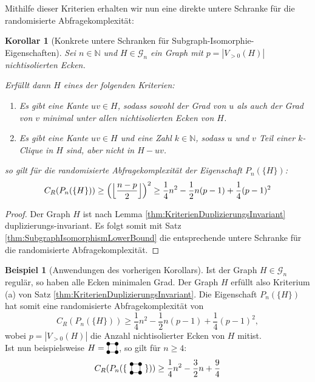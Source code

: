 \documentclass[10pt,a4paper, footheight=1mm, bibliography=totoc]{scrreprt}
\newtheorem{corollary}[definition]{Korollar}
\theoremstyle{definition}
\newtheorem{examplex}{Beispiel}
\newenvironment{example}[1]
{ \begin{leftbar} \begin{examplex}#1}
{ \end{examplex} \ignorespacesafterend \end{leftbar} }
\newcommand{\Square}{
\begin{tikzpicture}[main_node/.style={circle,fill=black},
inner sep=1.5pt, baseline=2pt]

    \node[main_node] (1) at (0,0) {};
    \node[main_node] (2) at (0.35, 0)  {};
    \node[main_node] (3) at (0.35, 0.35) {};
    \node[main_node] (4) at (0, 0.35) {};

    \draw (1) -- (2) -- (3) -- (4) -- (1);
\end{tikzpicture}
}
\begin{document}
Mithilfe dieser Kriterien erhalten wir nun
eine direkte untere Schranke für die randomisierte Abfragekomplexität:
\begin{corollary}[Konkrete untere Schranken für Subgraph-Isomorphie-Eigenschaften]
Sei $n\in \mathbb{N}$ und $H\in \mathcal{G}_n$ ein Graph
mit $p=|V_{>0}(H)|$ nichtisolierten Ecken.

Erfüllt dann $H$ eines der folgenden Kriterien:
\begin{enumerate}[label=\textbf{\emph{(\alph*)}}, leftmargin=*]
\item Es gibt eine Kante $uv\in H$, sodass sowohl
           der Grad von $u$ als auch der Grad von $v$
           minimal unter allen nichtisolierten Ecken von $H$.
\item Es gibt eine Kante $uv \in H$ und eine Zahl
           $k\in \mathbb{N}$, sodass $u$ und $v$
           Teil einer $k$-Clique in $H$ sind, aber nicht
           in $H-uv$.
\end{enumerate}
so gilt für die randomisierte Abfragekomplexität der Eigenschaft 
$P_n(\{H\})$:
$$ C_R(P_n(\{H\})) \geq
\Big{ ( } \Big \lfloor  \frac{n-p}{2} \Big \rfloor \Big{)}^{2} \geq
\frac{1}{4}n^2 - \frac{1}{2}n(p-1) + \frac{1}{4}(p-1)^2
$$
\end{corollary}
\begin{proof}
Der Graph $H$ ist nach Lemma \ref{thm:KriterienDuplizierungsInvariant}
duplizierungs-invariant. Es folgt somit mit 
Satz \ref{thm:SubgraphIsomorphismLowerBound} die entsprechende
untere Schranke für die randomisierte Abfragekomplexität.
\end{proof}

\begin{example}[Anwendungen des vorherigen Korollars]
Ist der Graph $H\in\mathcal{G}_n$ regulär, so haben
alle Ecken minimalen Grad. Der Graph $H$ erfüllt also Kriterium (a)
von Satz \ref{thm:KriterienDuplizierungsInvariant}.
Die Eigenschaft $P_n(\{H\})$ hat somit eine randomisierte
Abfragekomplexität von 
$$ C_R(P_n(\{H\})) \geq
\frac{1}{4}n^2 - \frac{1}{2}n(p-1) + \frac{1}{4}(p-1)^2,$$
wobei $p=|V_{>0}(H)|$ die Anzahl nichtisolierter Ecken von $H$ mitist. \\
Ist nun beispielsweise $H=\Square$, so gilt für $n\geq 4$:
$$ C_R(P_n(\{\ \Square \ \})) \geq
\frac{1}{4}n^2 - \frac{3}{2}n + \frac{9}{4}$$
\end{example}
\end{document}
